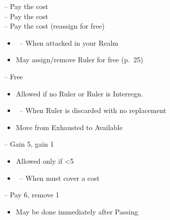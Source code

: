 \documentclass[10pt]{article}
\begin{document}
\framebreak

 -- Pay the \ducat cost\\
 -- Pay the \milpower cost\\
 -- Pay the \milpower cost (reassign for free)\\
\begin{itemize}
	\item \reaction~-- When attacked in your Realm
	\item May assign/remove Ruler for free (p.~25)
\end{itemize}
 -- Free
\begin{itemize}
	\item Allowed if no Ruler or Ruler is \dprime Interregn.\dprime
	\item \reaction~-- When Ruler is discarded with no replacement
\end{itemize}

\begin{itemize}
	\item Move \manpower from Exhausted to Available
\end{itemize}

 -- Gain 5\ducats, gain 1\interest
\begin{itemize}
	\item Allowed only if <5\interest
	\item \reaction~-- When must cover a cost
\end{itemize}
 -- Pay 6\ducats, remove 1\interest
\begin{itemize}
	\item May be done immediately after Passing
\end{itemize}
\end{document}
